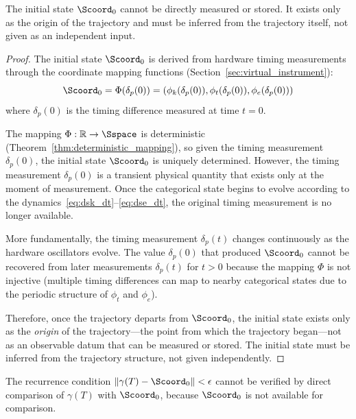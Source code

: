 \begin{theorem}
\label{thm:origin_inaccessible}
The initial state $\Scoord_0$ cannot be directly measured or stored. It exists only as the origin of the trajectory and must be inferred from the trajectory itself, not given as an independent input.
\end{theorem}

\begin{proof}
The initial state $\Scoord_0$ is derived from hardware timing measurements through the coordinate mapping functions (Section~\ref{sec:virtual_instrument}):
\begin{equation}
\Scoord_0 = \Phi(\delta_p(0)) = \left( \phi_k(\delta_p(0)), \phi_t(\delta_p(0)), \phi_e(\delta_p(0)) \right)
\label{eq:initial_state_measurement}
\end{equation}
where $\delta_p(0)$ is the timing difference measured at time $t = 0$.

The mapping $\Phi: \mathbb{R} \to \Sspace$ is deterministic (Theorem~\ref{thm:deterministic_mapping}), so given the timing measurement $\delta_p(0)$, the initial state $\Scoord_0$ is uniquely determined. However, the timing measurement $\delta_p(0)$ is a transient physical quantity that exists only at the moment of measurement. Once the categorical state begins to evolve according to the dynamics~\eqref{eq:dsk_dt}--\eqref{eq:dse_dt}, the original timing measurement is no longer available.

More fundamentally, the timing measurement $\delta_p(t)$ changes continuously as the hardware oscillators evolve. The value $\delta_p(0)$ that produced $\Scoord_0$ cannot be recovered from later measurements $\delta_p(t)$ for $t > 0$ because the mapping $\Phi$ is not injective (multiple timing differences can map to nearby categorical states due to the periodic structure of $\phi_t$ and $\phi_e$).

Therefore, once the trajectory departs from $\Scoord_0$, the initial state exists only as the \textit{origin} of the trajectory—the point from which the trajectory began—not as an observable datum that can be measured or stored. The initial state must be inferred from the trajectory structure, not given independently.
\end{proof}

\begin{corollary}
\label{cor:no_direct_verification}
The recurrence condition $\|\gamma(T) - \Scoord_0\| < \epsilon$ cannot be verified by direct comparison of $\gamma(T)$ with $\Scoord_0$, because $\Scoord_0$ is not available for comparison.
\end{corollary}

